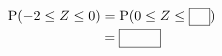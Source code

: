 \noindent\begin{minipage}[t]{0.58\linewidth}\vspace{0pt}\raggedright $\mathrm{P}(-2\le Z\le 0)=\mathrm{P}(0\le Z\le\blank)$\\ $\hphantom{\mathrm{P}(-2\le Z\le 0)}=\blank[3em]$\end{minipage}\hfill\begin{minipage}[t]{0.4\linewidth}\vspace{0pt}\centering \resizebox{\ifdim\width>\linewidth\linewidth\else\width\fi}{!}{}\end{minipage}\par
